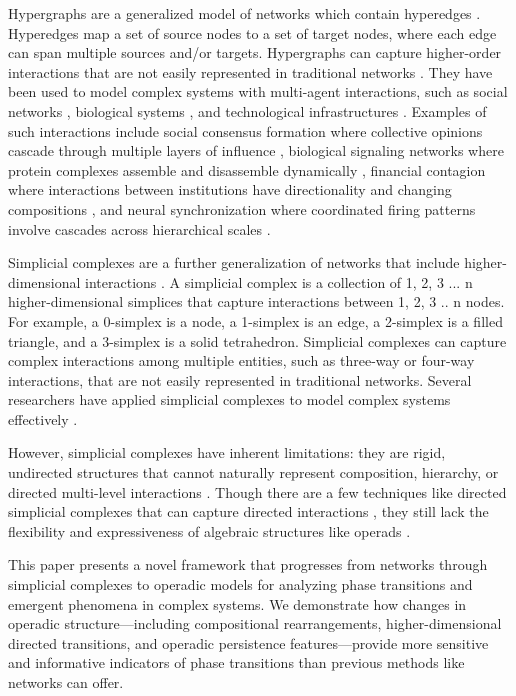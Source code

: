 Hypergraphs are a generalized model of networks which contain hyperedges \citep{berge1984hypergraphs, battiston2020networks}. Hyperedges map a set of source nodes to a set of target nodes, where each edge can span multiple sources and/or targets. Hypergraphs can capture higher-order interactions that are not easily represented in traditional networks \citep{benson2016higher}. They have been used to model complex systems with multi-agent interactions, such as social networks \citep{zhou2007learning}, biological systems \citep{klamt2009hypergraphs}, and technological infrastructures \citep{xu2013hypernetwork}. Examples of such interactions include social consensus formation where collective opinions cascade through multiple layers of influence \citep{neuhäuser2021consensus}, biological signaling networks where protein complexes assemble and disassemble dynamically \citep{ramadan2020hypergraph}, financial contagion where interactions between institutions have directionality and changing compositions \citep{hüser2020financial}, and neural synchronization where coordinated firing patterns involve cascades across hierarchical scales \citep{petri2014homological, giusti2016two, sizemore2018importance}.

Simplicial complexes are a further generalization of networks that include higher-dimensional interactions \citep{petri2014homological, giusti2016two, sizemore2018importance}. A simplicial complex is a collection of 1, 2, 3 ... n higher-dimensional simplices that capture interactions between 1, 2, 3 .. n nodes. For example, a 0-simplex is a node, a 1-simplex is an edge, a 2-simplex is a filled triangle, and a 3-simplex is a solid tetrahedron.  Simplicial complexes can capture complex interactions among multiple entities, such as three-way or four-way interactions, that are not easily represented in traditional networks. Several researchers have applied simplicial complexes to model complex systems effectively \citep{petri2014homological, giusti2016two, sizemore2018importance}.

However, simplicial complexes have inherent limitations: they are rigid, undirected structures that cannot naturally represent composition, hierarchy, or directed multi-level interactions \citep{gong2024higher}. Though there are a few techniques like directed simplicial complexes that can capture directed interactions \citep{masulli2016topology, mukherjee2016random, levi2014directed}, they still lack the flexibility and expressiveness of algebraic structures like operads \citep{baez1997higher, leinster2004higher, kapranov1999operad}.

This paper presents a novel framework that progresses from networks through simplicial complexes to operadic models for analyzing phase transitions and emergent phenomena in complex systems. We demonstrate how changes in operadic structure—including compositional rearrangements, higher-dimensional directed transitions, and operadic persistence features—provide more sensitive and informative indicators of phase transitions than previous methods like networks can offer.
